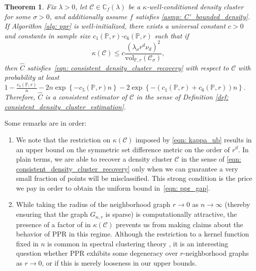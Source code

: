 \documentclass[11pt,twoside]{article}
\newtheorem{theorem}{Theorem}
\newcommand{\set}[1]{\left\{#1\right\}}
\newcommand{\vol}{\mathrm{vol}}
\newcommand{\1}{\mathbf{1}}
\newcommand{\Xbf}{X}             %
\newcommand{\Pbb}{\mathbb{P}}
\newcommand{\Cbb}{\mathbb{C}}
\newcommand{\Cset}{\mathcal{C}}
\newcommand{\Csig}{\Cset_{\sigma}}
\newcommand{\Cest}{\widehat{C}}
\begin{document}
\begin{theorem}
  \label{thm: consistent_recovery_of_density_clusters}
  Fix $\lambda > 0$, let $\Cset \in \Cbb_f(\lambda)$ be a
  $\kappa$-well-conditioned density cluster for some $\sigma > 0$, and
  additionally assume $f$ satisfies \ref{asmp: C'_bounded_density}. If Algorithm
  \ref{alg: ppr} is well-initialized, there exists a universal constant $c >  0$ and constants in sample size $c_1(\Pbb,r)$-$c_6(\Pbb,r)$ such that if  
  \begin{equation}
    \label{eqn: kappa_ub}
    \kappa(\Cset) \leq c \frac{(\lambda_{\sigma} r^d
      \nu_d)^2}{\vol_{\Pbb,r}(\Csig)}, 
  \end{equation}
  then $\Cest$ satisfies~\eqref{eqn: consistent_density_cluster_recovery} with respect to $\Cset$ with probability at least $1 - \frac{c_4(\Pbb,r)}{n} - 2n\exp\set{-c_5(\Pbb,r)n} - 2\exp\set{-(c_1(\Pbb,r) + c_6(\Pbb,r))n}$. Therefore, $\Cest$ is a consistent estimator of $\Cset$ in the sense of Definition \ref{def: consistent_density_cluster_estimation}. 
\end{theorem}
\noindent Some remarks are in order: 
 \begin{enumerate}  
 \item We note that the restriction on $\kappa(\Cset)$ imposed by \eqref{eqn:
    kappa_ub} results in an upper bound on the symmetric set difference metric \smash{$\Delta(\Csig[\Xbf],
    \Cest)$} on the order of $r^d$. In plain terms, we are able to recover a
  density cluster $\Cset$ in the sense of \eqref{eqn:
    consistent_density_cluster_recovery} only when we can guarantee a very small
  fraction of points will be misclassified. This strong condition is the price
  we pay in order to obtain the uniform bound in~\eqref{eqn: ppr_gap}. 
 \item While taking the radius of the neighborhood graph $r \to 0$ as $n \to
  \infty$ (thereby ensuring that the graph $G_{n,r}$ is sparse) is computationally
  attractive, the presence of a factor of  in
  $\kappa(\Cset)$ prevents us from making claims about the
  behavior of PPR in this regime. Although the restriction to a kernel
  function fixed in $n$ is common in spectral clustering theory
  \citep{schiebinger2015,vonluxburg2008}, it is an interesting question whether
  PPR exhibits some degeneracy over $r$-neighborhood graphs as $r \to 0$, or if
  this is merely looseness in our upper bounds.  
\end{enumerate}
\end{document}
